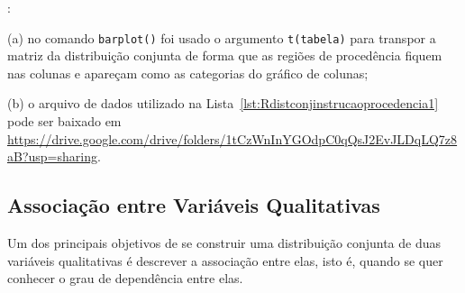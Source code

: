 \documentclass[11pt,fleqn]{book} %
\begin{document}
: 

\noindent (a) no comando \texttt{barplot()} foi usado o argumento \texttt{t(tabela)} para transpor a matriz da distribuição conjunta de forma que as regiões de procedência fiquem nas colunas e apareçam como as categorias do gráfico de colunas; 

\noindent (b) o arquivo de dados utilizado na Lista~\ref{lst:Rdistconjinstrucaoprocedencia1}  pode ser baixado em \url{https://drive.google.com/drive/folders/1tCzWnInYGOdpC0qQsJ2EvJLDqLQ7z8aB?usp=sharing}. \\



\subsection{Associação entre Variáveis Qualitativas}

Um dos principais objetivos de se construir uma distribuição conjunta de duas variáveis qualitativas é descrever a associação entre elas, isto é, quando se quer conhecer o grau de dependência entre elas. \\
\end{document}
